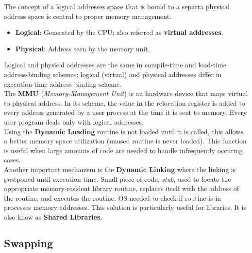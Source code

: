 \documentclass[12pt]{article}
\begin{document}
The concept of a logical addresses space that is bound to a separta physical address space is central to proper memory management.
\begin{itemize}
  \item \textbf{Logical}: Generated by the CPU; also referred as \textbf{virtual addresses}.
  \item \textbf{Physical}: Address seen by the memory unit.
\end{itemize}
Logical and physical addresses are the same in compile-time and load-time address-binding schemes; logical (virtual) and physical addresses differ in execution-time address-binding scheme.\\
The \textbf{MMU} (\textit{Memory-Management Unit}) is an hardware device that maps virtual to physical address. In its scheme, the value in the relocation register is added to every address generated by a user process at the time it is sent to memory. Every user program deals only with logical addresses.\\
Using the \textbf{Dynamic Loading} routine is not loaded until it is called, this allows a better memory space utilization (unused routine is never loaded). This function is useful when large amounts of code are needed to handle infrequently occuring cases.\\
Another important mechanism is the \textbf{Dynamic Linking} where the linking is postponed until execution time. Small piece of code, \textit{stub}, used to locate the appropriate memory-resident library routine, replaces itself with the address of the routine, and executes the routine. OS needed to check if routine is in processes memory addresses. This solution is particularly useful for libraries. It is also know as \textbf{Shared Libraries}.

\subsection{Swapping}
\end{document}
